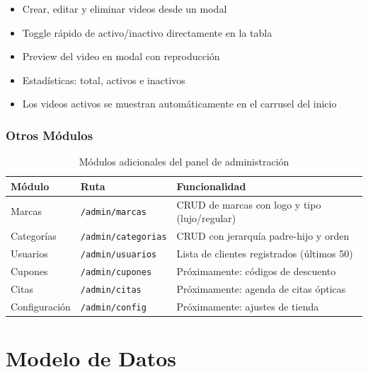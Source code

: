 \documentclass[12pt, a4paper]{article}
\begin{document}
\begin{tipbox}
\begin{itemize}[nosep]
    \item Crear, editar y eliminar videos desde un modal
    \item Toggle r\'{a}pido de activo/inactivo directamente en la tabla
    \item Preview del video en modal con reproducci\'{o}n
    \item Estad\'{i}sticas: total, activos e inactivos
    \item Los videos activos se muestran autom\'{a}ticamente en el carrusel del inicio
\end{itemize}
\end{tipbox}

\subsubsection{Otros M\'{o}dulos}

\begin{table}[H]
\centering
\begin{tabularx}{\textwidth}{llX}
\toprule
\textbf{M\'{o}dulo} & \textbf{Ruta} & \textbf{Funcionalidad} \\
\midrule
Marcas & \texttt{/admin/marcas} & CRUD de marcas con logo y tipo (lujo/regular) \\
Categor\'{i}as & \texttt{/admin/categorias} & CRUD con jerarqu\'{i}a padre-hijo y orden \\
Usuarios & \texttt{/admin/usuarios} & Lista de clientes registrados (\'{u}ltimos 50) \\
Cupones & \texttt{/admin/cupones} & Pr\'{o}ximamente: c\'{o}digos de descuento \\
Citas & \texttt{/admin/citas} & Pr\'{o}ximamente: agenda de citas \'{o}pticas \\
Configuraci\'{o}n & \texttt{/admin/config} & Pr\'{o}ximamente: ajustes de tienda \\
\bottomrule
\end{tabularx}
\caption{M\'{o}dulos adicionales del panel de administraci\'{o}n}
\end{table}

\section{Modelo de Datos}
\end{document}
